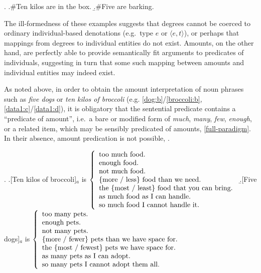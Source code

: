 \documentclass[a4paper,12pt,twoside]{article}
\begin{document}
	\ex.
	\a.\#\label{data1:e}Ten kilos are in the box.
	\b.\#\label{data1:f}Five are barking.
	
	The ill-formedness of these examples suggests that degrees cannot  be coerced to ordinary individual-based denotations (e.g.\ type  $e$ or $\langle e,t \rangle$), or perhaps that mappings from degrees to individual entities do not exist. Amounts, on the other hand, are perfectly able to provide semantically fit arguments to predicates of individuals, suggesting in turn that some such mapping between amounts and individual entities may indeed exist.
	
	As noted above, in order to obtain the amount interpretation of noun phrases such as \textit{five dogs} or \textit{ten kilos of broccoli} (e.g. \ref{dog:b}/\ref{broccoli:b}, \ref{data1:c}/\ref{data1:d}), it is obligatory that the sentential predicate contains a ``predicate of amount'', i.e.\ a bare or modified form of  \textit{much}, \textit{many}, \textit{few}, \textit{enough}, or a related item, which may be sensibly predicated of amounts, \ref{full-paradigm}. In their absence, amount predication is not possible, \NNext.

	\ex.\label{full-paradigm}
	\a.\label{data1:g}[Ten kilos of broccoli]$_a$ is
		$\left\{\begin{array}{ l }
		\textnormal{too much food.} \\
		\textnormal{enough food.} \\
		\textnormal{not much food.} \\
		\textnormal{$\{$more / less$\}$ food than we need.} \\
		\textnormal{the $\{$most / least$\}$ food that you can bring.}\\ 
		\textnormal{as much food as I can handle.} \\			
		\textnormal{so much food I cannot handle it.} 			
	\end{array}
	\right.$
	\b.\label{data1:h}[Five dogs]$_a$ is
	$\left\{\begin{array}{ l }
		\textnormal{too many pets.} \\
		\textnormal{enough pets.} \\
		\textnormal{not many pets.} \\
		\textnormal{$\{$more / fewer$\}$ pets than we have space for.} \\
		\textnormal{the $\{$most / fewest$\}$ pets we have space for.}\\ 
		\textnormal{as many pets as I can adopt.} \\			
		\textnormal{so many pets I cannot adopt them all.} 			
	\end{array}
	\right.$
\end{document}
